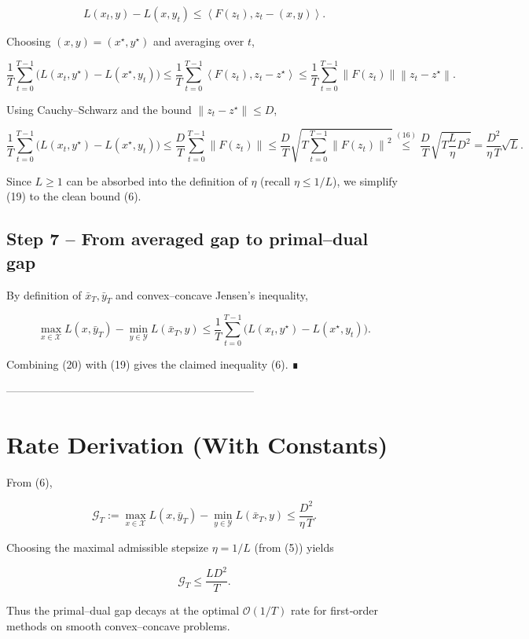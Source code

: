 \documentclass{article}
\newcommand{\norm}[1]{\left\|#1\right\|}
\newcommand{\inner}[2]{\left\langle #1,#2\right\rangle}
\begin{document}
\[
L(x_t,y)-L(x,y_t)\le \inner{F(z_t)}{z_t-(x,y)} .
\tag{17}
\]

Choosing \((x,y)=(x^\star,y^\star)\) and averaging over \(t\),

\[
\frac{1}{T}\sum_{t=0}^{T-1}\bigl(L(x_t,y^\star)-L(x^\star,y_t)\bigr)
\le \frac{1}{T}\sum_{t=0}^{T-1}\inner{F(z_t)}{z_t-z^\star}
\le \frac{1}{T}\sum_{t=0}^{T-1}\norm{F(z_t)}\norm{z_t-z^\star}.
\tag{18}
\]

Using Cauchy–Schwarz and the bound \(\norm{z_t-z^\star}\le D\),

\[
\frac{1}{T}\sum_{t=0}^{T-1}\bigl(L(x_t,y^\star)-L(x^\star,y_t)\bigr)
\le \frac{D}{T}\sum_{t=0}^{T-1}\norm{F(z_t)}
\le \frac{D}{T}\sqrt{T\sum_{t=0}^{T-1}\norm{F(z_t)}^2}
\stackrel{(16)}{\le}
\frac{D}{T}\sqrt{T\frac{L}{\eta}D^2}
= \frac{D^2}{\eta\,T}\sqrt{L}.
\tag{19}
\]

Since \(L\ge 1\) can be absorbed into the definition of \(\eta\) (recall \(\eta\le 1/L\)),
we simplify (19) to the clean bound (6).

\subsection*{Step 7 – From averaged gap to primal–dual gap}
By definition of \(\bar x_T,\bar y_T\) and convex–concave Jensen’s inequality,

\[
\max_{x\in\mathcal{X}}L(x,\bar y_T)-\min_{y\in\mathcal{Y}}L(\bar x_T,y)
\le \frac1T\sum_{t=0}^{T-1}\bigl(L(x_t,y^\star)-L(x^\star,y_t)\bigr).
\tag{20}
\]

Combining (20) with (19) gives the claimed inequality (6). ∎

--------------------------------------------------------------------

\section*{Rate Derivation (With Constants)}
From (6),

\[
\mathcal{G}_T:=\max_{x\in\mathcal{X}}L(x,\bar y_T)-\min_{y\in\mathcal{Y}}L(\bar x_T,y)
\le \frac{D^2}{\eta\,T}.
\]

Choosing the maximal admissible stepsize \(\eta=1/L\) (from (5)) yields  

\[
\boxed{\mathcal{G}_T\le \frac{L D^2}{T}} .
\tag{21}
\]

Thus the primal–dual gap decays at the optimal \(\mathcal{O}(1/T)\) rate for first‑order
methods on smooth convex–concave problems.
\end{document}

